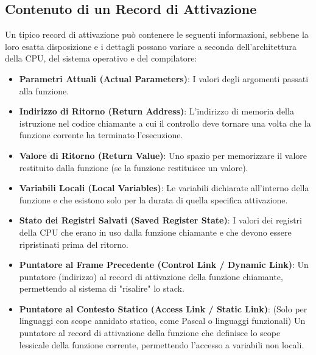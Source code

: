 \subsection{Contenuto di un Record di Attivazione}
Un tipico record di attivazione può contenere le seguenti informazioni, sebbene la loro esatta disposizione e i dettagli possano variare a seconda dell'architettura della CPU, del sistema operativo e del compilatore:
\begin{itemize}
    \item \textbf{Parametri Attuali (Actual Parameters)}: I valori degli argomenti passati alla funzione.
    \item \textbf{Indirizzo di Ritorno (Return Address)}: L'indirizzo di memoria della istruzione nel codice chiamante a cui il controllo deve tornare una volta che la funzione corrente ha terminato l'esecuzione.
    \item \textbf{Valore di Ritorno (Return Value)}: Uno spazio per memorizzare il valore restituito dalla funzione (se la funzione restituisce un valore).
    \item \textbf{Variabili Locali (Local Variables)}: Le variabili dichiarate all'interno della funzione e che esistono solo per la durata di quella specifica attivazione.
    \item \textbf{Stato dei Registri Salvati (Saved Register State)}: I valori dei registri della CPU che erano in uso dalla funzione chiamante e che devono essere ripristinati prima del ritorno.
    \item \textbf{Puntatore al Frame Precedente (Control Link / Dynamic Link)}: Un puntatore (indirizzo) al record di attivazione della funzione chiamante, permettendo al sistema di "risalire" lo stack.
    \item \textbf{Puntatore al Contesto Statico (Access Link / Static Link)}: (Solo per linguaggi con scope annidato statico, come Pascal o linguaggi funzionali) Un puntatore al record di attivazione della funzione che definisce lo scope lessicale della funzione corrente, permettendo l'accesso a variabili non locali.
\end{itemize}

